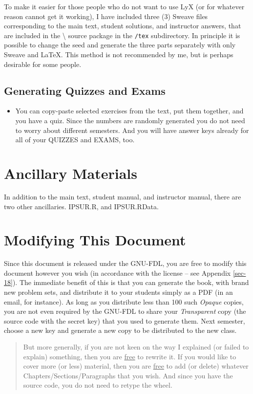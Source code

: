 \documentclass[captions=tableheading]{scrbook}
\begin{document}
\begin{example}
To make it easier for those people who do not want to use LyX (or for whatever reason cannot get it working), I have included three (3) Sweave files corresponding to the main text, student solutions, and instructor answers, that are included in the \IPSUR\textbackslash{} source package in the \texttt{/tex} subdirectory. In principle it is possible to change the seed and generate the three parts separately with only Sweave and \LaTeX{}. This method is not recommended by me, but is perhaps desirable for some people.
\subsection{Generating Quizzes and Exams}
\label{sec-23-2-1}

\begin{itemize}
\item You can copy-paste selected exercises from the text, put them together, and you have a quiz. Since the numbers are randomly generated you do not need to worry about different semesters. And you will have answer keys already for all of your QUIZZES and EXAMS, too.
\end{itemize}
\section{Ancillary Materials}
\label{sec-23-3}
\label{sec-Ancillary-Materials}


In addition to the main text, student manual, and instructor manual, there are two other ancillaries. IPSUR.R, and IPSUR.RData.
\section{Modifying This Document}
\label{sec-23-4}
\label{sec-Modifying-This-Document}


Since this document is released under the GNU-FDL, you are free to modify this document however you wish (in accordance with the license -- see Appendix \ref{sec-18}). The immediate benefit of this is that you can generate the book, with brand new problem sets, and distribute it to your students simply as a PDF (in an email, for instance). As long as you distribute less than 100 such \emph{Opaque} copies, you are not even required by the GNU-FDL to share your \emph{Transparent} copy (the source code with the secret key) that you used to generate them. Next semester, choose a new key and generate a new copy to be distributed to the new class. 

\begin{quote}
But more generally, if you are not keen on the way I explained (or failed to explain) something, then you are \underline{free} to rewrite it. If you would like to cover more (or less) material, then you are \underline{free} to add (or delete) whatever Chapters/Sections/Paragraphs that you wish. And since you have the source code, you do not need to retype the wheel. 
\end{quote}


\end{example}
\end{document}
